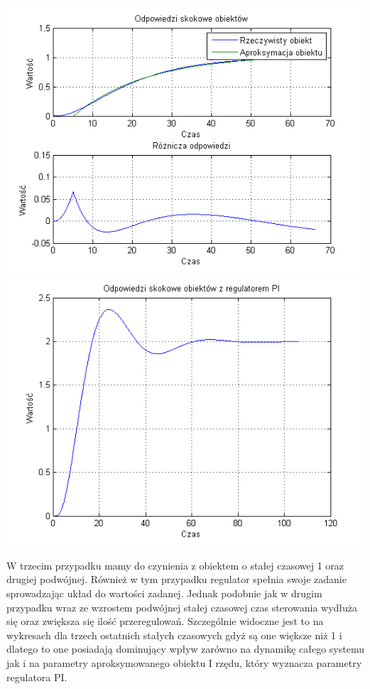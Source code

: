\documentclass[10pt,a4paper]{article}
\begin{document}
\begin{center}
\includegraphics[scale=1]{images/jeden/skrypt_103.png}\\
\includegraphics[scale=1]{images/jeden/skrypt_104.png}\\
\end{center}
\newpage
W trzecim przypadku mamy do czynienia z obiektem o stałej czasowej 1 oraz drugiej podwójnej. Również w tym przypadku regulator spełnia swoje zadanie sprowadzając układ do wartości zadanej. Jednak podobnie jak w drugim przypadku wraz ze wzrostem podwójnej stałej czasowej czas sterowania wydłuża się oraz zwiększa się ilość przeregulowań. Szczególnie widoczne jest to na wykresach dla trzech ostatnich stałych czasowych gdyż są one większe niż 1 i dlatego to one posiadają dominujący wpływ zarówno na dynamikę całego systemu jak i na parametry aproksymowanego obiektu I rzędu, który wyznacza parametry regulatora PI. 
\newpage
\end{document}
